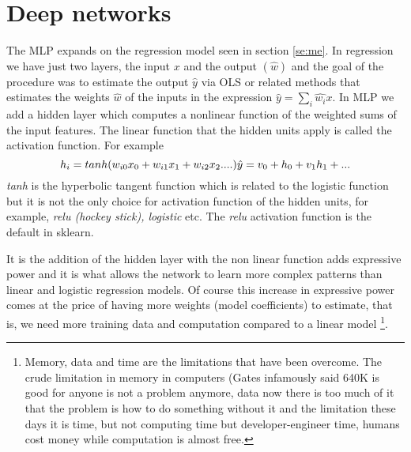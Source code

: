 \documentclass[11pt]{article}
\begin{document}


\section{Deep networks}
\label{se:deep}

The MLP expands on the regression model seen in section \ref{se:me}. In regression we have just two layers, the input $x$ and the output $(\hat{w})$ and the goal of the procedure was to estimate the output $\hat{y}$ via OLS or related methods that estimates the weights $\hat{w}$ of the inputs in the expression $\hat{y} = \sum_i \hat{w_i} x$. In MLP we add a hidden layer which computes a nonlinear function of the weighted sums of the input features. The linear function that the hidden units apply is called the activation function. For example
\begin{equation}
h_i = tanh(w_{i0}x_0 + w_{i1}x_1 + w_{i2}x_2 ....) \\
\hat{y} = v_0 + h_0 + v_1 h_1 + ...
\end{equation}
\textit{tanh} is the hyperbolic tangent function which is related to the logistic function but it is not the only choice for activation function of the hidden units, for example, \textit{relu (hockey stick), logistic} etc. The \textit{relu} activation function is the default in sklearn.

It is the addition of the hidden layer with the non linear function adds expressive power and it is what allows the network to learn more complex patterns than linear and logistic regression models. Of course this increase in expressive power comes at the price of having more weights (model coefficients) to estimate, that is, we need more training data and computation compared to a linear model \footnote{Memory, data and time are the limitations that have been overcome. The crude limitation in memory in computers (Gates infamously said  640K is good for anyone is not a problem anymore, data now there is too much of it that the problem is how to do something without it and the limitation these days it is time, but not computing time but developer-engineer time, humans cost money while computation is almost free.}.
\end{document}
